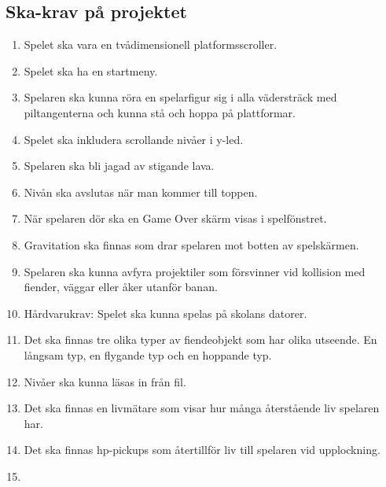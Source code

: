 \documentclass{TDP005mall}
\begin{document}
\subsection{Ska-krav på projektet}
\begin{enumerate}
\item Spelet ska vara en tvådimensionell platformsscroller.
\item Spelet ska ha en startmeny.
\item Spelaren ska kunna röra en spelarfigur sig i alla vädersträck med piltangenterna och kunna stå och hoppa på plattformar.
\item Spelet ska inkludera scrollande nivåer i y-led.
\item Spelaren ska bli jagad av stigande lava.
\item Nivån ska avslutas när man kommer till toppen.
\item När spelaren dör ska en Game Over skärm visas i spelfönstret.
\item Gravitation ska finnas som drar spelaren mot botten av spelskärmen.
\item Spelaren ska kunna avfyra projektiler som försvinner vid kollision med fiender, väggar eller åker utanför banan.
\item Hårdvarukrav: Spelet ska kunna spelas på skolans datorer.
\item Det ska finnas tre olika typer av fiendeobjekt som har olika utseende. En långsam typ, en flygande typ och en hoppande typ.
\item Nivåer ska kunna läsas in från fil.
\item Det ska finnas en livmätare som visar hur många återstående liv spelaren har.
\item Det ska finnas hp-pickups som återtillför liv till spelaren vid upplockning.
\item  

\end{enumerate}
\end{document}
